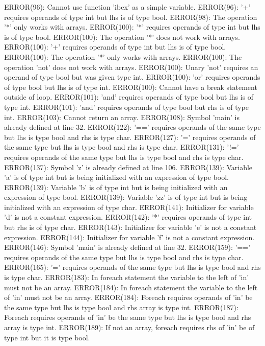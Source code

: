 \documentclass[12pt]{book}
\begin{document}
ERROR(96): Cannot use function 'ibex' as a simple variable.
ERROR(96): '+' requires operands of type int but lhs is of type bool.
ERROR(98): The operation '*' only works with arrays.
ERROR(100): '*' requires operands of type int but lhs is of type bool.
ERROR(100): The operation '*' does not work with arrays.
ERROR(100): '+' requires operands of type int but lhs is of type bool.
ERROR(100): The operation '*' only works with arrays.
ERROR(100): The operation 'not' does not work with arrays.
ERROR(100): Unary 'not' requires an operand of type bool but was given type int.
ERROR(100): 'or' requires operands of type bool but lhs is of type int.
ERROR(100): Cannot have a break statement outside of loop.
ERROR(101): 'and' requires operands of type bool but lhs is of type int.
ERROR(101): 'and' requires operands of type bool but rhs is of type int.
ERROR(103): Cannot return an array.
ERROR(108): Symbol 'main' is already defined at line 32.
ERROR(122): '==' requires operands of the same type but lhs is type bool and rhs is type char.
ERROR(127): '=' requires operands of the same type but lhs is type bool and rhs is type char.
ERROR(131): '!=' requires operands of the same type but lhs is type bool and rhs is type char.
ERROR(137): Symbol 'z' is already defined at line 106.
ERROR(139): Variable 'a' is of type int but is being initialized with an expression of type bool.
ERROR(139): Variable 'b' is of type int but is being initialized with an expression of type bool.
ERROR(139): Variable 'zz' is of type int but is being initialized with an expression of type char.
ERROR(141): Initializer for variable 'd' is not a constant expression.
ERROR(142): '*' requires operands of type int but rhs is of type char.
ERROR(143): Initializer for variable 'e' is not a constant expression.
ERROR(144): Initializer for variable 'f' is not a constant expression.
ERROR(146): Symbol 'main' is already defined at line 32.
ERROR(159): '==' requires operands of the same type but lhs is type bool and rhs is type char.
ERROR(165): '=' requires operands of the same type but lhs is type bool and rhs is type char.
ERROR(183): In foreach statement the variable to the left of 'in' must not be an array.
ERROR(184): In foreach statement the variable to the left of 'in' must not be an array.
ERROR(184): Foreach requires operands of 'in' be the same type but lhs is type bool and rhs array is type int.
ERROR(187): Foreach requires operands of 'in' be the same type but lhs is type bool and rhs array is type int.
ERROR(189): If not an array, foreach requires rhs of 'in' be of type int but it is type bool.
\end{document}
